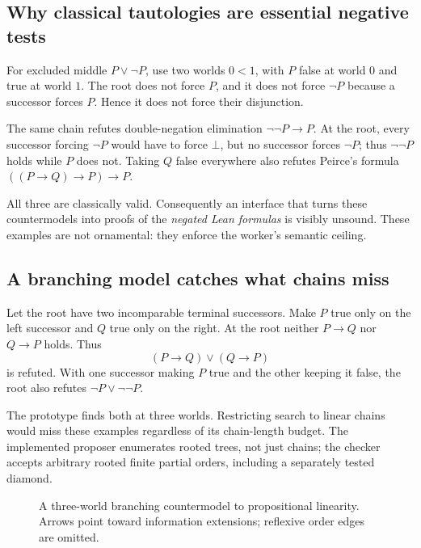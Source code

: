 \subsection{Why classical tautologies are essential negative tests}
For excluded middle $P\lor\neg P$, use two worlds $0<1$, with $P$ false at
world $0$ and true at world $1$. The root does not force $P$, and it does not
force $\neg P$ because a successor forces $P$. Hence it does not force their
disjunction.

The same chain refutes double-negation elimination
$\neg\neg P\to P$. At the root, every successor forcing $\neg P$ would have
to force $\bot$, but no successor forces $\neg P$; thus $\neg\neg P$ holds
while $P$ does not. Taking $Q$ false everywhere also refutes Peirce's formula
$((P\to Q)\to P)\to P$.

All three are classically valid. Consequently an interface that turns these
countermodels into proofs of the \emph{negated Lean formulas} is visibly
unsound. These examples are not ornamental: they enforce the worker's
semantic ceiling.

\subsection{A branching model catches what chains miss}
Let the root have two incomparable terminal successors. Make $P$ true only on
the left successor and $Q$ true only on the right. At the root neither
$P\to Q$ nor $Q\to P$ holds. Thus
\[
 (P\to Q)\lor(Q\to P)
\]
is refuted. With one successor making $P$ true and the other keeping it false,
the root also refutes $\neg P\lor\neg\neg P$.

The prototype finds both at three worlds. Restricting search to linear chains
would miss these examples regardless of its chain-length budget. The
implemented proposer enumerates rooted trees, not just chains; the checker
accepts arbitrary rooted finite partial orders, including a separately tested
diamond.

\begin{figure}[ht]
\centering
{}
\caption{A three-world branching countermodel to propositional linearity.
Arrows point toward information extensions; reflexive order edges are omitted.}
\end{figure}

